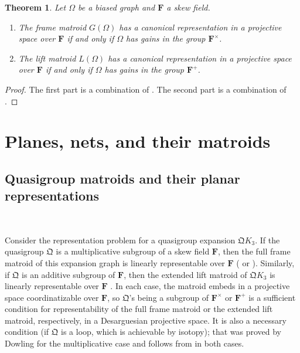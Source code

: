 \documentclass[reqno,12pt]{amsart}
\newtheorem{thm}{Theorem}[section]
\theoremstyle{remark}
\numberwithin{equation}{section}
\numberwithin{figure}{section}
\newcommand\fF{\mathbf{F}}	%
\newcommand \fQ{\mathfrak Q}
\begin{document}
\begin{thm}\label{T:canonicalrep}
Let $\Omega$ be a biased graph and $\fF$ a skew field.  
\begin{enumerate}[{\rm(i)}]
\item The frame matroid $G(\Omega)$ has a canonical representation in a projective space over $\fF$ if and only if $\Omega$ has gains in the group $\fF^\times$.  
\item The lift matroid $L(\Omega)$ has a canonical representation in a projective space over $\fF$ if and only if $\Omega$ has gains in the group $\fF^+$.  
\end{enumerate}
\end{thm}

\begin{proof}
The first part is a combination of \cite[Theorem IV.2.1 and Proposition IV.2.4]{BG}.  The second part is a combination of \cite[Theorem IV.4.1 and Proposition IV.4.3]{BG}. 
\end{proof}




\section{Planes, nets, and their matroids}\label{planes}

\subsection{Quasigroup matroids and their planar representations}\label{qmatroids}\

Consider the representation problem for a quasigroup expansion $\fQ K_3$.  If the quasigroup $\fQ$ is a multiplicative subgroup of a skew field $\fF$, then the full frame matroid of this expansion graph is linearly representable over $\fF$ (\cite{CGL} or \cite[Theorem IV.2.1]{BG}).  Similarly, if $\fQ$  is an additive subgroup of $\fF$, then the extended lift matroid of $\fQ K_3$ is linearly representable over $\fF$ \cite[Theorem IV.4.1]{BG}.  In each case, the matroid embeds in a projective space coordinatizable over $\fF$, so $\fQ$'s being a subgroup of $\fF^\times$ or $\fF^+$ is a sufficient condition for representability of the full frame matroid or the extended lift matroid, respectively, in a Desarguesian projective space.  It is also a necessary condition (if $\fQ$ is a loop, which is achievable by isotopy); that was proved by Dowling \cite{CGL} for the multiplicative case and follows from \cite[Theorem IV.7.1]{BG} in both cases.
\end{document}
